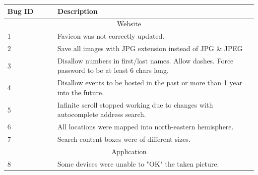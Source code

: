 \begin{tabular}{|p{0.2\linewidth} p{0.8\linewidth}|}
\hline
\cellcolor{gray!25} \textbf{Bug ID} & \cellcolor{gray!25} \textbf{Description} \\
\hline
\multicolumn{2}{|c|}{\cellcolor{gray!25} Website} \\
\hline
1 & Favicon was not correctly updated. \\
2 & Save all images with JPG extension instead of JPG \& JPEG \\
3 & Disallow numbers in first/last names. Allow dashes. Force password to be at least 6 chars long. \\
4 & Disallow events to be hosted in the past or more than 1 year into the future. \\
5 & Infinite scroll stopped working due to changes with autocomplete address search. \\
6 & All locations were mapped into north-eastern hemisphere. \\
7 & Search content boxes were of different sizes. \\
\hline
\multicolumn{2}{|c|}{\cellcolor{gray!25} Application} \\
\hline
8 & Some devices were unable to "OK" the taken picture. \\
\hline
\end{tabular}
